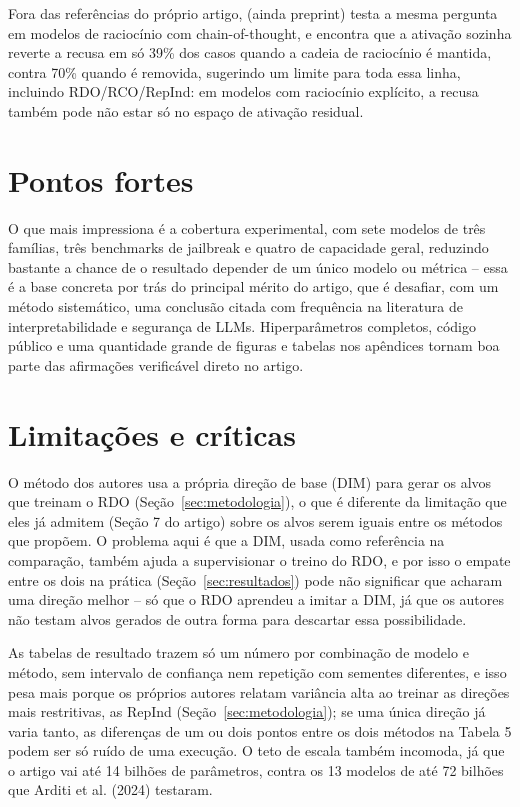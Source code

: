 \documentclass[article,11pt,oneside,a4paper,brazil,section=TITLE]{setup/abntex2}
\begin{document}
Fora das referências do próprio artigo, \textcite{yang2026beyond} (ainda preprint) testa a mesma pergunta em modelos de raciocínio com chain-of-thought, e encontra que a ativação sozinha reverte a recusa em só 39\% dos casos quando a cadeia de raciocínio é mantida, contra 70\% quando é removida, sugerindo um limite para toda essa linha, incluindo RDO/RCO/RepInd: em modelos com raciocínio explícito, a recusa também pode não estar só no espaço de ativação residual.

\section{Pontos fortes}

O que mais impressiona é a cobertura experimental, com sete modelos de três famílias, três benchmarks de jailbreak e quatro de capacidade geral, reduzindo bastante a chance de o resultado depender de um único modelo ou métrica -- essa é a base concreta por trás do principal mérito do artigo, que é desafiar, com um método sistemático, uma conclusão citada com frequência na literatura de interpretabilidade e segurança de LLMs. Hiperparâmetros completos, código público e uma quantidade grande de figuras e tabelas nos apêndices tornam boa parte das afirmações verificável direto no artigo.

\section{Limitações e críticas}

O método dos autores usa a própria direção de base (DIM) para gerar os alvos que treinam o RDO (Seção~\ref{sec:metodologia}), o que é diferente da limitação que eles já admitem (Seção 7 do artigo) sobre os alvos serem iguais entre os métodos que propõem. O problema aqui é que a DIM, usada como referência na comparação, também ajuda a supervisionar o treino do RDO, e por isso o empate entre os dois na prática (Seção~\ref{sec:resultados}) pode não significar que acharam uma direção melhor -- só que o RDO aprendeu a imitar a DIM, já que os autores não testam alvos gerados de outra forma para descartar essa possibilidade.

As tabelas de resultado trazem só um número por combinação de modelo e método, sem intervalo de confiança nem repetição com sementes diferentes, e isso pesa mais porque os próprios autores relatam variância alta ao treinar as direções mais restritivas, as RepInd (Seção~\ref{sec:metodologia}); se uma única direção já varia tanto, as diferenças de um ou dois pontos entre os dois métodos na Tabela 5 podem ser só ruído de uma execução. O teto de escala também incomoda, já que o artigo vai até 14 bilhões de parâmetros, contra os 13 modelos de até 72 bilhões que Arditi et al. (2024) testaram.
\end{document}
